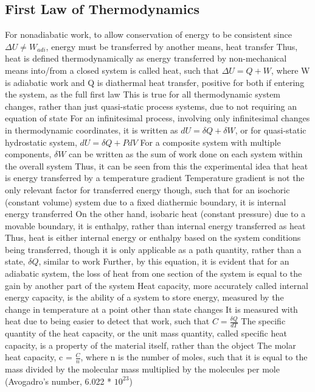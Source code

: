 \documentclass[11 pt, twoside]{article}
\newenvironment{outline*}
{
	\begin{outline}[enumerate]
	}
	{\end{outline}
}
\begin{document}
\subsection{First Law of Thermodynamics}
\begin{outline*}
\1 For nonadiabatic work, to allow conservation of energy to be consistent since $\Delta U \neq W_{adi}$, energy must be transferred by another means, heat transfer
\2 Thus, heat is defined thermodynamically as energy transferred by non-mechanical means into/from a closed system is called heat, such that $\Delta U = Q + W$, where W is adiabatic work and Q is diathermal heat transfer, positive for both if entering the system, as the full first law
\3 This is true for all thermodynamic system changes, rather than just quasi-static process systems, due to not requiring an equation of state
\3 For an infinitesimal process, involving only infinitesimal changes in thermodynamic coordinates, it is written as $dU = \delta Q + \delta W$, or for quasi-static hydrostatic system, $dU = \delta Q + PdV$
\3 For a composite system with multiple components, $\delta W$ can be written as the sum of work done on each system within the overall system
\2 Thus, it can be seen from this the experimental idea that heat is energy transferred by a temperature gradient
\2 Temperature gradient is not the only relevant factor for transferred energy though, such that for an isochoric (constant volume) system due to a fixed diathermic boundary, it is internal energy transferred
\3 On the other hand, isobaric heat (constant pressure) due to a movable boundary, it is enthalpy, rather than internal energy transferred as heat
\3 Thus, heat is either internal energy or enthalpy based on the system conditions being transferred, though it is only applicable as a path quantity, rather than a state, $\delta Q$, similar to work
\2 Further, by this equation, it is evident that for an adiabatic system, the loss of heat from one section of the system is equal to the gain by another part of the system
\1 Heat capacity, more accurately called internal energy capacity, is the ability of a system to store energy, measured by the change in temperature at a point other than state changes
\2 It is measured with heat due to being easier to detect that work, such that $C = \frac{\delta Q}{dT}$
\2 The specific quantity of the heat capacity, or the unit mass quantity, called specific heat capacity, is a property of the material itself, rather than the object
\3 The molar heat capacity, c = $\frac{C}{n}$, where n is the number of moles, such that it is equal to the mass divided by the molecular mass multiplied by the molecules per mole (Avogadro's number, 6.022 * $10^23$)

\end{outline*}
\end{document}
